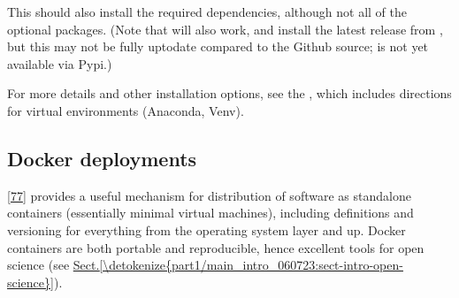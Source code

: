 \documentclass[letterpaper,table,10pt,english]{jupyterBook}
\begin{document}
\begin{sphinxVerbatim}[commandchars=\\\{\}]
  
  

\end{sphinxVerbatim}

\sphinxAtStartPar
This should also install the required dependencies, although not all of the optional packages. (Note that  will also work, and install the latest release from , but this may not be fully up\sphinxhyphen{}to\sphinxhyphen{}date compared to the Github source;  is not yet available via Pypi.)

\sphinxAtStartPar
For more details and other installation options, see the , which includes directions for virtual environments (Anaconda, Venv).


\subsection{Docker deployments}
\label{\detokenize{part1/platform_intro_070723:docker-deployments}}\label{\detokenize{part1/platform_intro_070723:sect-platform-docker}}
\sphinxAtStartPar
{} {[}\hyperlink{cite.backmatter/bibliography:id587}{77}{]} provides a useful mechanism for distribution of software as stand\sphinxhyphen{}alone containers (essentially minimal virtual machines), including definitions and versioning for everything from the operating system layer and up. Docker containers are both portable and reproducible, hence excellent tools for open science (see \hyperref[\detokenize{part1/main_intro_060723:sect-intro-open-science}]{Sect.\@ \ref{\detokenize{part1/main_intro_060723:sect-intro-open-science}}}).
\end{document}
